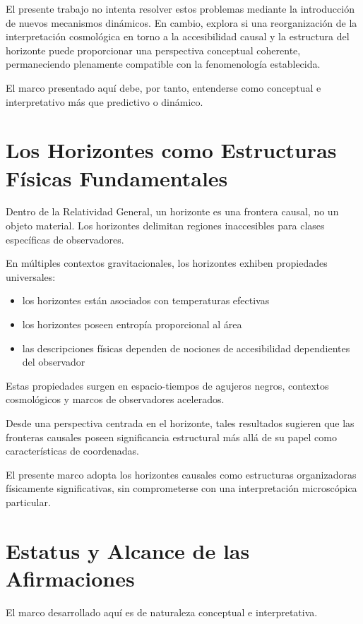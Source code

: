 \documentclass[12pt,a4paper]{article}
\begin{document}
El presente trabajo no intenta resolver estos problemas mediante la introducción de nuevos mecanismos dinámicos. En cambio, explora si una reorganización de la interpretación cosmológica en torno a la accesibilidad causal y la estructura del horizonte puede proporcionar una perspectiva conceptual coherente, permaneciendo plenamente compatible con la fenomenología establecida.

El marco presentado aquí debe, por tanto, entenderse como conceptual e interpretativo más que predictivo o dinámico.

\section{Los Horizontes como Estructuras Físicas Fundamentales}

Dentro de la Relatividad General, un horizonte es una frontera causal, no un objeto material. Los horizontes delimitan regiones inaccesibles para clases específicas de observadores.

En múltiples contextos gravitacionales, los horizontes exhiben propiedades universales:

\begin{itemize}
  \item los horizontes están asociados con temperaturas efectivas
  \item los horizontes poseen entropía proporcional al área
  \item las descripciones físicas dependen de nociones de accesibilidad dependientes del observador
\end{itemize}

Estas propiedades surgen en espacio-tiempos de agujeros negros, contextos cosmológicos y marcos de observadores acelerados.

Desde una perspectiva centrada en el horizonte, tales resultados sugieren que las fronteras causales poseen significancia estructural más allá de su papel como características de coordenadas.

El presente marco adopta los horizontes causales como estructuras organizadoras físicamente significativas, sin comprometerse con una interpretación microscópica particular.

\section{Estatus y Alcance de las Afirmaciones}

El marco desarrollado aquí es de naturaleza conceptual e interpretativa.
\end{document}
